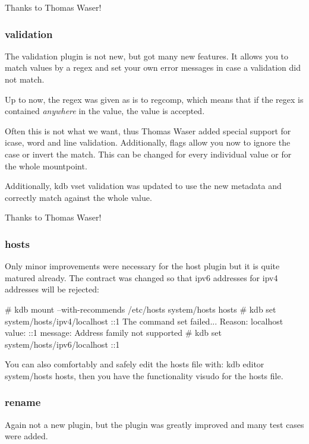 Thanks to Thomas Waser!

\subsubsection*{validation}

The validation plugin is not new, but got many new features. It allows you to match values by a regex and set your own error messages in case a validation did not match.

Up to now, the regex was given as is to regcomp, which means that if the regex is contained {\itshape anywhere} in the value, the value is accepted.

Often this is not what we want, thus Thomas Waser added special support for icase, word and line validation. Additionally, flags allow you now to ignore the case or invert the match. This can be changed for every individual value or for the whole mountpoint.

Additionally, {\ttfamily kdb vset} validation was updated to use the new metadata and correctly match against the whole value.

Thanks to Thomas Waser!

\subsubsection*{hosts}

Only minor improvements were necessary for the host plugin but it is quite matured already. The contract was changed so that ipv6 addresses for ipv4 addresses will be rejected\+:


\begin{DoxyCode}
# kdb mount --with-recommends /etc/hosts system/hosts hosts
# kdb set system/hosts/ipv4/localhost ::1
The command set failed...
Reason: localhost value: ::1 message: Address family not supported
# kdb set system/hosts/ipv6/localhost ::1
\end{DoxyCode}


You can also comfortably and safely edit the hosts file with\+: {\ttfamily kdb editor system/hosts hosts}, then you have the functionality {\ttfamily visudo} for the hosts file.

\subsubsection*{rename}

Again not a new plugin, but the plugin was greatly improved and many test cases were added.

